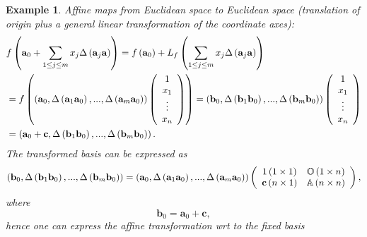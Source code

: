 \documentclass[aps,preprint]{revtex4}%
\newtheorem{example}[theorem]{Example}
\begin{document}
\begin{example}
Affine maps from Euclidean space to Euclidean space (translation of origin
plus a general linear transformation of the coordinate axes):
\begin{align}
&  f\left(  \mathbf{a}_{0}+\sum_{1\leq j\leq m}x_{j}\Delta\left(
\mathbf{a}_{j}\mathbf{a}\right)  \right)  =f\left(  \mathbf{a}_{0}\right)
+L_{f}\left(  \sum_{1\leq j\leq m}x_{j}\Delta\left(  \mathbf{a}_{j}%
\mathbf{a}\right)  \right) \\
&  =f\left(  \left(  \mathbf{a}_{0},\Delta\left(  \mathbf{a}_{1}\mathbf{a}%
_{0}\right)  ,...,\Delta\left(  \mathbf{a}_{m}\mathbf{a}_{0}\right)  \right)
\left(
\begin{array}
[c]{c}%
1\\
x_{1}\\
\vdots\\
x_{n}%
\end{array}
\right)  \right)  =\left(  \mathbf{b}_{0},\Delta\left(  \mathbf{b}%
_{1}\mathbf{b}_{0}\right)  ,...,\Delta\left(  \mathbf{b}_{m}\mathbf{b}%
_{0}\right)  \right)  \left(
\begin{array}
[c]{c}%
1\\
x_{1}\\
\vdots\\
x_{n}%
\end{array}
\right) \\
&  =\left(  \mathbf{a}_{0}+\mathbf{c},\Delta\left(  \mathbf{b}_{1}%
\mathbf{b}_{0}\right)  ,...,\Delta\left(  \mathbf{b}_{m}\mathbf{b}_{0}\right)
\right)  .
\end{align}
The transformed basis can be expressed as
\begin{equation}
\left(  \mathbf{b}_{0},\Delta\left(  \mathbf{b}_{1}\mathbf{b}_{0}\right)
,...,\Delta\left(  \mathbf{b}_{m}\mathbf{b}_{0}\right)  \right)  =\left(
\mathbf{a}_{0},\Delta\left(  \mathbf{a}_{1}\mathbf{a}_{0}\right)
,...,\Delta\left(  \mathbf{a}_{m}\mathbf{a}_{0}\right)  \right)  \left(
\begin{array}
[c]{cc}%
1\left(  1\times1\right)  & \mathbb{O}\left(  1\times n\right) \\
\mathbf{c}\left(  n\times1\right)  & \mathbb{A}\left(  n\times n\right)
\end{array}
\right)  ,
\end{equation}
where
\begin{equation}
\mathbf{b}_{0}=\mathbf{a}_{0}+\mathbf{c,}%
\end{equation}
hence one can express the affine transformation wrt to the fixed basis

\end{example}
\end{document}
